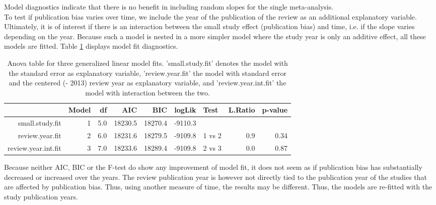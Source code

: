 \documentclass[11pt,a4paper,twoside]{book}\usepackage[]{graphicx}\usepackage[]{color}
\begin{document}
Model diagnostics indicate that there is no benefit in including random slopes for the single meta-analysis. \\
To test if publication bias varies over time, we include the year of the publication of the review as an additional explanatory variable. Ultimately, it is of interest if there is an interaction between the small study effect (publication bias) and time, i.e. if the slope varies depending on the year. Because such a model is nested in a more simpler model where the study year is only an additive effect, all these models are fitted. Table \ref{anova.lme} displays model fit diagnostics.

\begin{table}[ht]
\centering
\begingroup\scriptsize
\begin{tabular}{rrrrrrlrr}
  \hline
 & Model & df & AIC & BIC & logLik & Test & L.Ratio & p-value \\ 
  \hline
small.study.fit &  1 & 5.0 & 18230.5 & 18270.4 & -9110.3 &  &  &  \\ 
  review.year.fit &  2 & 6.0 & 18231.6 & 18279.5 & -9109.8 & 1 vs 2 & 0.9 & 0.34 \\ 
  review.year.int.fit &  3 & 7.0 & 18233.6 & 18289.4 & -9109.8 & 2 vs 3 & 0.0 & 0.87 \\ 
   \hline
\end{tabular}
\endgroup
\caption{Anova table for three generalized linear model fits. 'small.study.fit' denotes the model with the standard error as explanatory variable, 'review.year.fit' the model with standard error and the centered (- 2013) review year as explanatory variable, and 'review.year.int.fit' the model with interaction between the two.} 
\label{anova.lme}
\end{table}


Because neither AIC, BIC or the F-test do show any improvement of model fit, it does not seem as if publication bias has substantially decreased or increased over the years. The review publication year is however not directly tied to the publication year of the studies that are affected by publication bias. Thus, using another measure of time, the results may be different. Thus, the models are re-fitted with the study publication years. 
\end{document}
